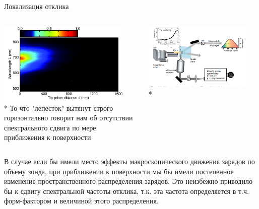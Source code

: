 \documentclass[9pt, compress, xcolor=table]{beamer}
\begin{document}
\begin{frame}{Локализация отклика}
\begin{columns}[c]
\column{6.5cm}
\begin{center}
\includegraphics[width=0.9\textwidth]{plasmon-res}
\\* \small{То что "лепесток" вытянут строго горизонтально говорит нам об отсутствии спектрального сдвига по мере приближения к поверхности}
\end{center}

\column{6.5cm}
\begin{center}
\includegraphics[width=0.9\textwidth]{exp_plasm_res}
\\* 
\end{center}
\end{columns}
\begin{center}


\end{center}

В случае если бы имели место эффекты макроскопического движения зарядов по объему зонда, при приближении к поверхности мы бы имели постепенное изменение пространственного распределения зарядов. Это неизбежно приводило бы к сдвигу спектральной частоты отклика, т.к. эта частота определяется в т.ч. форм-фактором и величиной этого распределения.

\end{frame}
\end{document}
